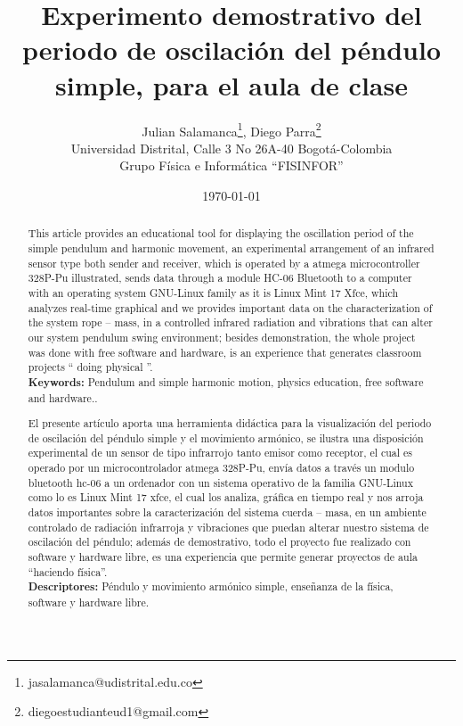 \documentclass[12pt]{article}
\title{\bf{Experimento demostrativo del periodo de oscilación del péndulo simple, para el aula de clase}}
\author{Julian Salamanca\footnote{jasalamanca@udistrital.edu.co}, Diego Parra\footnote{diegoestudianteud1@gmail.com} \\
  Universidad Distrital, Calle 3 No 26A-40 Bogotá-Colombia\\
  Grupo Física e Informática ``FISINFOR''
}
\date{\today}
\def\tablename{Tabla}%
\begin{document}
\renewcommand{\tablename}{Tabla}
\maketitle
\vspace{-0.8cm}

\begin{abstract}
This article provides an educational tool for displaying the oscillation period of the simple pendulum and harmonic movement, an experimental arrangement of an infrared sensor type both sender and receiver, which is operated by a atmega microcontroller 328P-Pu illustrated, sends data through a module HC-06 Bluetooth to a computer with an operating system GNU-Linux family as it is Linux Mint 17 Xfce, which analyzes real-time graphical and we provides important data on the characterization of the system rope – mass, in a controlled infrared radiation and vibrations that can alter our system pendulum swing environment; besides demonstration, the whole project was done with free software and hardware, is an experience that generates classroom projects `` doing physical ''.\\

{\bf{Keywords:}} Pendulum and simple harmonic motion, physics education, free software and hardware..
\end{abstract}
\begin{abstract}

El presente artículo aporta una herramienta didáctica para la visualización del periodo de oscilación del péndulo  simple y el movimiento armónico,  se ilustra una disposición experimental de un sensor de tipo infrarrojo  tanto emisor como receptor,  el cual es operado por un microcontrolador atmega 328P-Pu, envía datos a través  un modulo bluetooth hc-06 a un ordenador con un sistema operativo de la familia GNU-Linux como lo es Linux Mint 17 xfce, el cual los analiza, gráfica en tiempo real  y nos arroja  datos importantes sobre la caracterización del sistema cuerda – masa, en un ambiente controlado de radiación infrarroja y vibraciones que puedan alterar nuestro sistema de  oscilación del péndulo; además de demostrativo, todo el proyecto fue realizado con software y hardware libre, es una experiencia que permite generar proyectos de aula ``haciendo física''.\\

{\bf{Descriptores:}} Péndulo y movimiento armónico simple, enseñanza de la física, software y hardware libre.
\end{abstract}
\end{document}
